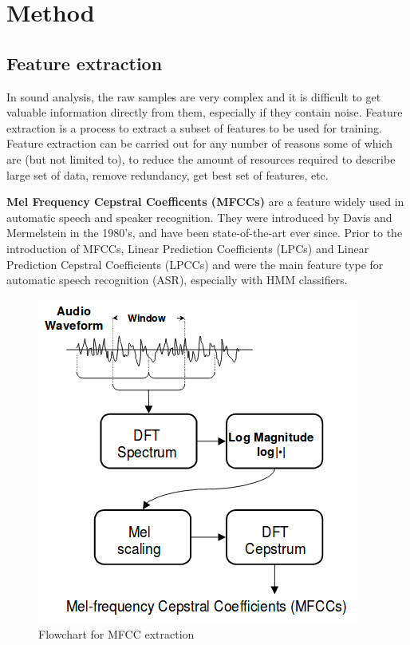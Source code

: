 \documentclass{article} %
\begin{document}
\section{Method}

	\subsection{Feature extraction}
		In sound analysis, the raw samples are very complex and it is difficult to get valuable information directly from them, especially if they contain noise.
		Feature extraction is a process to extract a subset of features to be used for training. Feature extraction can be carried out for any number of reasons some of which are (but not limited to), to reduce the amount of resources required to describe large set of data, remove redundancy, get best set of features, etc.

		\textbf{Mel Frequency Cepstral Coefficents (MFCCs)} are a feature widely used in automatic speech and speaker recognition. They were introduced by Davis and Mermelstein in the 1980's, and have been state-of-the-art ever since. Prior to the introduction of MFCCs, Linear Prediction Coefficients (LPCs) and Linear Prediction Cepstral Coefficients (LPCCs) and were the main feature type for automatic speech recognition (ASR), especially with HMM classifiers.\\

		\begin{figure}[H]
		\centering
		  \includegraphics[width=0.5\linewidth]{steps_mfcc.png}
		  \caption{Flowchart for MFCC extraction}
		  \label{fig:mfccflowchart}
		\end{figure}
\end{document}
